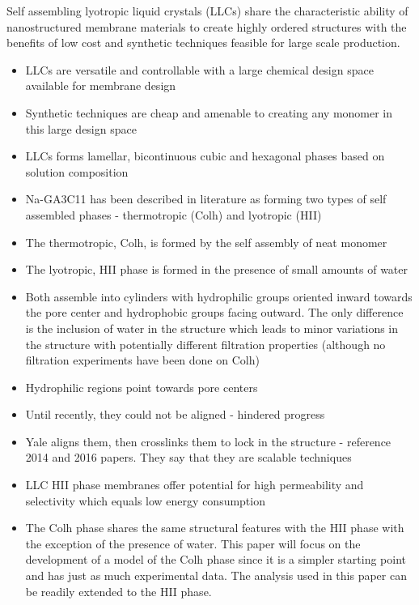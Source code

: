 \documentclass{article}
\begin{document}
	Self assembling lyotropic liquid crystals (LLCs) share the characteristic ability of nanostructured membrane materials to create highly ordered structures with the benefits of low cost and synthetic techniques feasible for large scale production.
	\begin{itemize}
		\item LLCs are versatile and controllable with a large chemical design space available for membrane design
		\item Synthetic techniques are cheap and amenable to creating any monomer in this large design space
		\item LLCs forms lamellar, bicontinuous cubic and hexagonal phases based on solution composition
		\item Na-GA3C11 has been described in literature as forming two types of self assembled phases - thermotropic (Colh) and lyotropic (HII)
		\item The thermotropic, Colh, is formed by the self assembly of neat monomer
		\item The lyotropic, HII phase is formed in the presence of small amounts of water
		\item Both assemble into cylinders with hydrophilic groups oriented inward towards the pore center and hydrophobic groups facing outward. The only difference is the inclusion of water in the structure which leads to minor variations in the structure with potentially different filtration properties (although no filtration experiments have been done on Colh)  
		\item Hydrophilic regions point towards pore centers
		\item Until recently, they could not be aligned - hindered progress
		\item Yale aligns them, then crosslinks them to lock in the structure - reference 2014 and 2016 papers. They say that they are scalable techniques
		\item LLC HII phase membranes offer potential for high permeability and selectivity which equals low energy consumption
		\item The Colh phase shares the same structural features with the HII phase with the exception of the presence of water. This paper will focus on the development of a model of the Colh phase since it is a simpler starting point and has just as much experimental data. The analysis used in this paper can be readily extended to the HII phase. 
	\end{itemize}
	
\end{document}
